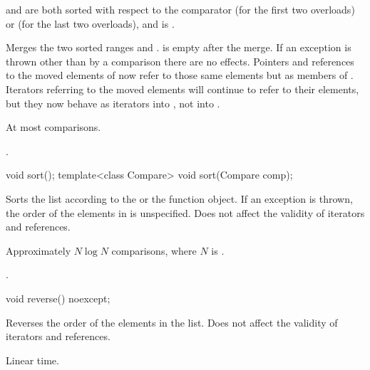 \begin{itemdescr}
\pnum
\expects
{} and  are both sorted with respect to
the comparator  (for the first two overloads) or
 (for the last two overloads), and
 is .

\pnum
\effects
Merges the two sorted ranges  and
.  is empty after the merge. If an
exception is thrown other than by a comparison there are no effects.
Pointers and references to the moved elements of  now refer to those same elements
but as members of . Iterators referring to the moved elements will continue to
refer to their elements, but they now behave as iterators into , not into
.

\pnum
\complexity
At most  comparisons.

\pnum
\remarks
{}.
\end{itemdescr}

%
\begin{itemdecl}
void sort();
template<class Compare> void sort(Compare comp);
\end{itemdecl}

\begin{itemdescr}
\pnum
\effects
Sorts the list according to the  or the  function object.
If an exception is thrown, the order of the elements in  is unspecified.
Does not affect the validity of iterators and references.

\pnum
\complexity
Approximately $N \log N$ comparisons, where $N$ is .

\pnum
\remarks
{}.
\end{itemdescr}

%
\begin{itemdecl}
void reverse() noexcept;
\end{itemdecl}

\begin{itemdescr}
\pnum
\effects
Reverses the order of the elements in the list.
Does not affect the validity of iterators and references.

\pnum
\complexity
Linear time.
\end{itemdescr}

